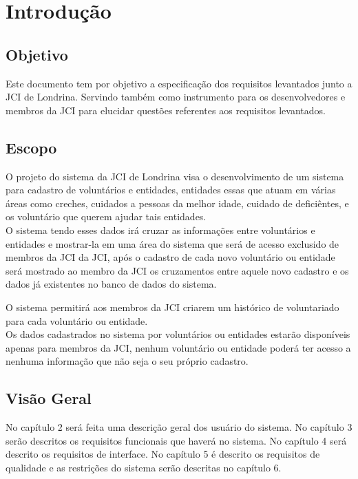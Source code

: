  \section{Introdução}

  \subsection{Objetivo}
  Este documento tem por objetivo a especificação dos requisitos levantados junto a JCI de Londrina. Servindo também como instrumento para os desenvolvedores e membros 
  da JCI para elucidar questões referentes aos requisitos levantados.

  \subsection{Escopo}
    
   O projeto do sistema da JCI de Londrina visa o desenvolvimento de um sistema para cadastro de voluntários e entidades, entidades essas que atuam em várias áreas como creches, 
   cuidados a pessoas da melhor idade, cuidado de deficiêntes, e os voluntário que querem ajudar tais entidades.\\
   O sistema tendo esses dados irá cruzar as informações entre voluntários e entidades e mostrar-la em uma área do sistema que será de acesso exclusido de membros da JCI
   da JCI, após o cadastro de cada novo voluntário ou entidade será mostrado ao membro da JCI os cruzamentos entre aquele novo cadastro e os dados já existentes no 
   banco de dados do sistema.

   O sistema permitirá aos membros da JCI criarem um histórico de voluntariado para cada voluntário ou entidade.\\
   Os dados cadastrados no sistema por voluntários ou entidades estarão disponíveis apenas para membros da JCI, nenhum voluntário ou entidade poderá ter acesso a nenhuma 
   informação que não seja o seu próprio cadastro.

  \subsection{Visão Geral}
  
  No capítulo 2 será feita uma descrição geral dos usuário do sistema. No capítulo 3 serão descritos os requisitos funcionais que haverá no sistema. No 
  capítulo 4 será descrito os requisitos de interface. No capítulo 5 é descrito os requisitos de qualidade e as restrições do sistema serão descritas no capítulo 6.

